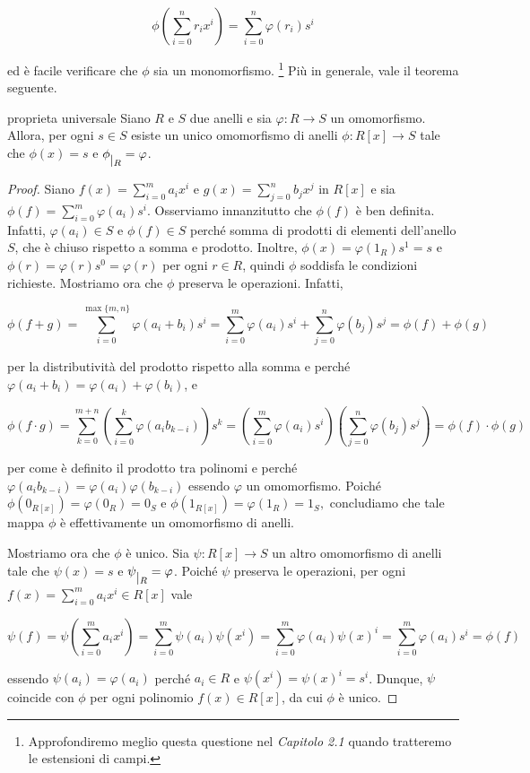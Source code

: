 $$\phi\left( \sum\limits_{i=0}^n r_ix^i \right)=\sum\limits_{i=0}^n \varphi(r_i)s^i$$ 

ed è facile verificare che $\phi$ sia un monomorfismo.
\footnote{Approfondiremo meglio questa questione nel \emph{Capitolo 2.1} quando tratteremo le estensioni di campi.} 
Più in generale, vale il teorema seguente.

\begin{teo}{proprieta universale}
Siano $R$ e $S$ due anelli e sia $\varphi\colon R\to S$ un omomorfismo. Allora, per ogni $s\in S$ esiste 
un unico omomorfismo di anelli $\phi\colon R[x]\to S$ tale che $\phi(x)=s$ e $\phi \raisebox{-.5em}{$\vert_{R}$}= \varphi$.
\end{teo}
\vspace{-4mm}
\begin{proof}Siano $f(x)=\sum\limits_{i=0}^m a_i x^i$ e $g(x)=\sum\limits_{j=0}^n b_j x^j$ in $R[x]$ 
e sia $\phi(f)=\sum\limits_{i=0}^m \varphi(a_i) s^i$. Osserviamo innanzitutto che $\phi(f)$ è ben definita. 
Infatti, $\varphi(a_i)\in S$ e $\phi(f)\in S$ perché somma di prodotti di elementi dell'anello $S$, 
che è chiuso rispetto a somma e prodotto. Inoltre, $\phi(x)=\varphi(1_R)s^1=s$ e $\phi(r)=\varphi(r)s^0=\varphi(r)$ 
per ogni $r\in R$, quindi $\phi$ soddisfa le condizioni richieste. Mostriamo ora che $\phi$ preserva le operazioni. Infatti, 

\[ \phi(f+g)=\sum\limits_{i=0}^{\max\{m,n\}}\varphi(a_i+b_i)s^i=\sum\limits_{i=0}^{m}\varphi(a_i)s^i+\sum\limits_{j=0}^{n}\varphi(b_j)s^j=\phi(f)+\phi(g) \] 

per la distributività del prodotto rispetto alla somma e perché $\varphi(a_i+b_i)=\varphi(a_i)+\varphi(b_i)$, e 

\[ \phi(f\cdot g)=\sum\limits_{k=0}^{m+n}\left(\sum\limits_{i=0}^{k}\varphi(a_ib_{k-i})\right)
s^k=\left(\sum\limits_{i=0}^{m}\varphi(a_i)s^i\right)\left(\sum\limits_{j=0}^{n}\varphi(b_j)s^j\right)=\phi(f)\cdot \phi(g) \] 

per come è definito il prodotto tra polinomi e perché $\varphi(a_ib_{k-i})=\varphi(a_i)\varphi(b_{k-i})$ essendo $\varphi$ 
un omomorfismo. Poiché $\phi(0_{R[x]})=\varphi(0_R)=0_S$ e $\phi(1_{R[x]})=\varphi(1_R)=1_S,$ 
concludiamo che tale mappa $\phi$ è effettivamente un omomorfismo di anelli.

\vspace{1mm}

\noindent Mostriamo ora che $\phi$ è unico. Sia $\psi\colon R[x]\to S$ un altro omomorfismo di anelli 
tale che $\psi(x)=s$ e $\psi \raisebox{-.5em}{$\vert_{R}$}= \varphi$. 
Poiché $\psi$ preserva le operazioni, per ogni $f(x)=\sum\limits_{i=0}^m a_i x^i\in R[x]$ vale 

\[ \psi(f) = \psi\left( \sum\limits_{i=0}^m a_i x^i \right) = 
\sum\limits_{i=0}^m \psi(a_i) \psi(x^i)=\sum\limits_{i=0}^m \varphi(a_i) \psi(x)^i=\sum\limits_{i=0}^m \varphi(a_i) s^i=\phi(f) \] 

essendo $\psi(a_i)=\varphi(a_i)$ perché $a_i\in R$ e $\psi(x^i)=\psi(x)^i=s^i$. 
Dunque, $\psi$ coincide con $\phi$ per ogni polinomio $f(x)\in R[x]$, da cui $\phi$ è unico.
\end{proof}


